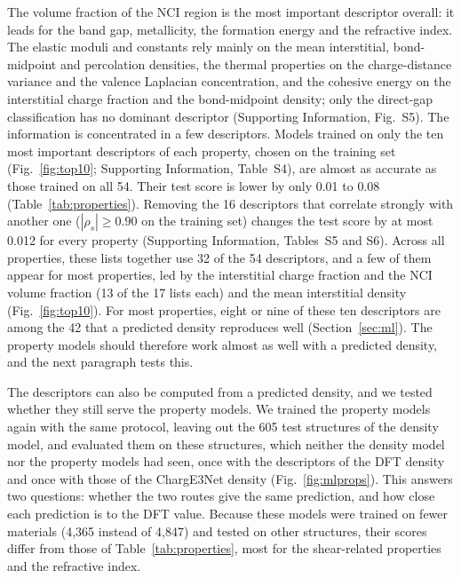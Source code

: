 \documentclass[journal=jctcce,manuscript=article,email=true]{achemso}
\newcommand{\rev}[1]{{\color{blue}#1}}
\begin{document}
\rev{The volume fraction of the NCI region is the most important descriptor
overall: it leads for the band gap, metallicity, the formation energy and the
refractive index. The elastic moduli and constants rely mainly on the mean
interstitial, bond-midpoint and percolation densities, the} thermal properties \rev{on the
charge-distance variance and the valence Laplacian concentration, and the
cohesive energy on the interstitial charge fraction and the bond-midpoint density}; only the direct-gap classification has no dominant
descriptor (Supporting Information, Fig.~S5). The information is concentrated
in a few descriptors. Models trained on only the ten most important descriptors
of each property, chosen on the training set (Fig.~\ref{fig:top10};
Supporting Information, Table~S4), are almost as accurate as those trained on
all \rev{54}. Their test score is lower by only 0.01 to \rev{0.08}
(Table~\ref{tab:properties}). Removing the \rev{16} descriptors that correlate
strongly with another one ($|\rho_s|\geq0.90$ on the training set) changes the
test score by at most \rev{0.012 for every property} (Supporting Information, Tables~S5 and S6).
Across all properties, these lists together use \rev{32 of the 54} descriptors, and
a few of them appear for most properties, led by \rev{the interstitial charge
fraction and the NCI volume fraction (13 of the 17 lists each) and the mean
interstitial density} (Fig.~\ref{fig:top10}). For most
properties, eight or nine of these ten descriptors are among the \rev{42} that a
predicted density reproduces well (Section~\ref{sec:ml}). The property models
should therefore work almost as well with a predicted density, and the next
paragraph tests this.

The descriptors can also be computed from a predicted density, and we tested
whether they still serve the property models. We trained the property models
again with the same protocol, leaving out the 605 test structures of the
density model, and evaluated them on these structures, which neither the
density model nor the property models had seen, once with the descriptors of the DFT
density and once with those of the ChargE3Net density
(Fig.~\ref{fig:mlprops}). This answers two questions: whether the two routes
give the same prediction, and how close each prediction is to the DFT value.
Because these models were trained on fewer materials (4,365 instead of 4,847)
and tested on other structures, their scores differ from those of
Table~\ref{tab:properties}, most for the shear-related properties and the
refractive index.
\end{document}
